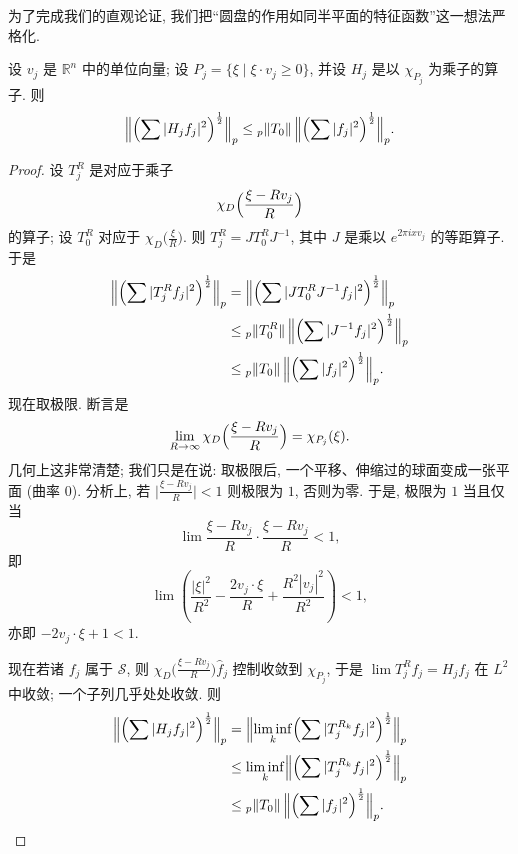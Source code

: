 为了完成我们的直观论证, 我们把``圆盘的作用如同半平面的特征函数''这一想法严格化.

\begin{theorem}\label{thm:7.2}
设 $v_j$ 是 $\mathbb{R}^n$ 中的单位向量; 设 $P_j=\{\xi \mid \xi\cdot v_j\geq 0\}$, 并设 $H_j$ 是以 $\chi_{P_j}$ 为乘子的算子. 则
\[
\Bigl\|\Bigl(\sum|H_{j}f_{j}|^{2}\Bigr)^{\frac{1}{2}}\Bigr\|_{p}
\leq{}_{p}\|T_{0}\|\,\Bigl\|\Bigl(\sum|f_{j}|^{2}\Bigr)^{\frac{1}{2}}\Bigr\|_{p}.
\]
\end{theorem}

\begin{proof}
设 $T_{j}^{R}$ 是对应于乘子
\[
\chi_{D}\Bigl(\frac{\xi-Rv_{j}}{R}\Bigr)
\]
的算子; 设 $T_0^R$ 对应于 $\chi_D\bigl(\frac{\xi}{R}\bigr)$. 则 $T_j^R=JT_0^RJ^{-1}$, 其中 $J$ 是乘以 $e^{2\pi ixv_j}$ 的等距算子. 于是
\begin{align*}
\Bigl\|\Bigl(\sum|T_{j}^{R} f_{j}|^{2}\Bigr)^{\frac{1}{2}}\Bigr\|_{p}
&=\Bigl\|\Bigl(\sum|JT_{0}^{R}J^{-1}f_{j}|^{2}\Bigr)^{\frac{1}{2}}\Bigr\|_{p} \\
&\leq{}_{p}\|T_{0}^{R}\|\,\Bigl\|\Bigl(\sum|J^{-1}f_{j}|^{2}\Bigr)^{\frac{1}{2}}\Bigr\|_{p} \\
&\leq{}_{p}\|T_{0}\|\,\Bigl\|\Bigl(\sum|f_{j}|^{2}\Bigr)^{\frac{1}{2}}\Bigr\|_{p}.
\end{align*}
现在取极限. 断言是
\[
\lim_{R\to\infty}\chi_{D}\Bigl(\frac{\xi-Rv_{j}}{R}\Bigr)=\chi_{P_{j}}(\xi).
\]
几何上这非常清楚; 我们只是在说: 取极限后, 一个平移、伸缩过的球面变成一张平面 (曲率 $0$). 分析上, 若 $\bigl|\frac{\xi-Rv_j}{R}\bigr|<1$ 则极限为 $1$, 否则为零. 于是, 极限为 $1$ 当且仅当
\[
\lim\frac{\xi-Rv_{j}}{R}\cdot\frac{\xi-Rv_{j}}{R}<1,
\]
即
\[
\lim\left(\frac{|\xi|^{2}}{R^{2}}-\frac{2v_{j}\cdot\xi}{R}+\frac{R^{2}|v_{j}|^{2}}{R^{2}}\right)<1,
\]
亦即 $-2v_j\cdot\xi+1<1$.

现在若诸 $f_j$ 属于 $\mathcal{S}$, 则 $\chi_D\bigl(\frac{\xi-Rv_j}{R}\bigr)\hat{f}_j$ 控制收敛到 $\chi_{P_j}$, 于是 $\lim T_j^Rf_j=H_jf_j$ 在 $L^2$ 中收敛; 一个子列几乎处处收敛. 则
\begin{align*}
\Bigl\|\Bigl(\sum|H_{j}f_{j}|^{2}\Bigr)^{\frac{1}{2}}\Bigr\|_{p}
&=\Bigl\|\liminf_{k}\Bigl(\sum|T_{j}^{R_{k}}f_{j}|^{2}\Bigr)^{\frac{1}{2}}\Bigr\|_{p} \\
&\leq\liminf_{k}\Bigl\|\Bigl(\sum|T_{j}^{R_{k}}f_{j}|^{2}\Bigr)^{\frac{1}{2}}\Bigr\|_{p} \\
&\leq{}_{p}\|T_{0}\|\,\Bigl\|\Bigl(\sum|f_{j}|^{2}\Bigr)^{\frac{1}{2}}\Bigr\|_{p}. \qedhere
\end{align*}
\end{proof}

